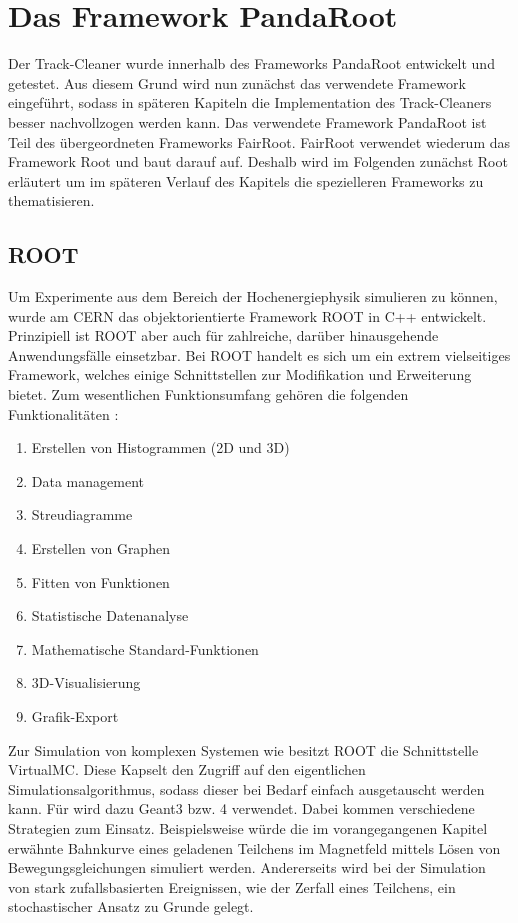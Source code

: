 \chapter{Das Framework PandaRoot}
Der Track-Cleaner wurde innerhalb des Frameworks PandaRoot entwickelt und getestet. Aus diesem Grund wird nun zunächst das verwendete Framework eingeführt, sodass in späteren Kapiteln die Implementation des Track-Cleaners besser nachvollzogen werden kann. Das verwendete Framework PandaRoot ist Teil des übergeordneten Frameworks FairRoot. FairRoot verwendet wiederum das Framework Root und baut darauf auf. Deshalb wird im Folgenden zunächst Root erläutert um im späteren Verlauf des Kapitels die spezielleren Frameworks zu thematisieren.

\section{ROOT}
Um Experimente aus dem Bereich der Hochenergiephysik simulieren zu können, wurde am CERN das objektorientierte Framework ROOT in C++ entwickelt. Prinzipiell ist ROOT aber auch für zahlreiche, darüber hinausgehende Anwendungsfälle einsetzbar. Bei ROOT handelt es sich um ein extrem vielseitiges Framework, welches einige Schnittstellen zur Modifikation und Erweiterung bietet. Zum wesentlichen Funktionsumfang gehören die folgenden Funktionalitäten \cite{Root_Linux}:
\begin{enumerate}
	\item Erstellen von Histogrammen (2D und 3D)
	\item Data management
	\item Streudiagramme
	\item Erstellen von Graphen
	\item Fitten von Funktionen
	\item Statistische Datenanalyse
	\item Mathematische Standard-Funktionen
	\item 3D-Visualisierung
	\item Grafik-Export
\end{enumerate} 
Zur Simulation von komplexen Systemen wie \pnd{} besitzt ROOT die Schnittstelle VirtualMC. Diese Kapselt den Zugriff auf den eigentlichen Simulationsalgorithmus, sodass dieser bei Bedarf einfach ausgetauscht werden kann. Für \pnd{} wird dazu Geant3 bzw. 4 verwendet. Dabei kommen verschiedene Strategien zum Einsatz. Beispielsweise würde die im vorangegangenen Kapitel erwähnte Bahnkurve eines geladenen Teilchens im Magnetfeld mittels Lösen von Bewegungsgleichungen simuliert werden. Andererseits wird bei der Simulation von stark zufallsbasierten Ereignissen, wie der Zerfall eines Teilchens, ein stochastischer Ansatz zu Grunde gelegt.  \cite[S. 16]{MasterJette}

